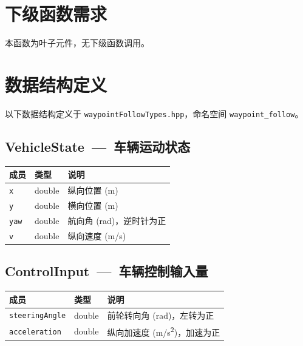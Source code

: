 \documentclass[a4paper,10pt]{article}
\begin{document}
\section{下级函数需求}

本函数为叶子元件，无下级函数调用。

\section{数据结构定义}

以下数据结构定义于 \texttt{waypointFollowTypes.hpp}，命名空间 \texttt{waypoint\_follow}。

\subsection{VehicleState~---~车辆运动状态}

\begin{longtable}{|L{3.5cm}|C{2cm}|L{9.5cm}|}
\hline
\textbf{成员} & \textbf{类型} & \textbf{说明} \\
\hline
\texttt{x} & double & 纵向位置 (m) \\
\hline
\texttt{y} & double & 横向位置 (m) \\
\hline
\texttt{yaw} & double & 航向角 (rad)，逆时针为正 \\
\hline
\texttt{v} & double & 纵向速度 (m/s) \\
\hline
\end{longtable}

\subsection{ControlInput~---~车辆控制输入量}

\begin{longtable}{|L{3.5cm}|C{2cm}|L{9.5cm}|}
\hline
\textbf{成员} & \textbf{类型} & \textbf{说明} \\
\hline
\texttt{steeringAngle} & double & 前轮转向角 (rad)，左转为正 \\
\hline
\texttt{acceleration} & double & 纵向加速度 (m/s\textsuperscript{2})，加速为正 \\
\hline
\end{longtable}
\end{document}
